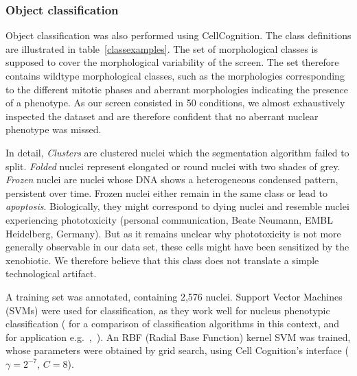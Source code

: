 \subsubsection{Object classification}
Object classification was also performed using CellCognition. The
class definitions are illustrated in table~\ref{classexamples}. The
set of morphological classes is supposed to cover the morphological
variability of the screen. The set therefore contains wildtype
morphological classes, such as the morphologies corresponding to the
different mitotic phases and aberrant morphologies indicating the
presence of a phenotype. As our screen consisted in 50 conditions, we
almost exhaustively inspected the dataset and are therefore confident
that no aberrant nuclear phenotype was missed. 


In detail, \textit{Clusters} are clustered nuclei which the
segmentation algorithm failed to split. \textit{Folded} nuclei
represent elongated or round nuclei with two shades of
grey. \textit{Frozen} nuclei are nuclei whose DNA shows a
heterogeneous condensed pattern, persistent over time. Frozen nuclei
either remain in the same class or lead to 
\textit{apoptosis}. Biologically, they might correspond to dying
nuclei and resemble nuclei experiencing phototoxicity (personal
communication, Beate Neumann, EMBL Heidelberg,
Germany). But as it remains unclear why phototoxicity is not more
generally observable in our data set, these cells might have been sensitized by the
xenobiotic. We therefore believe that this class does not translate a
simple technological artifact. 


A training set was annotated, containing 2,576 nuclei. Support Vector Machines (SVMs) were used for classification, as they work well for nucleus phenotypic classification (\cite{kovalev} for a comparison of classification algorithms in this context, and for application e.g.~\cite{cellcognition},~\cite{Walter2010}). An RBF (Radial Base Function) kernel SVM was trained, whose parameters were obtained by grid search, using Cell Cognition's interface ($\gamma=2^{-7}$, $C=8$).%

